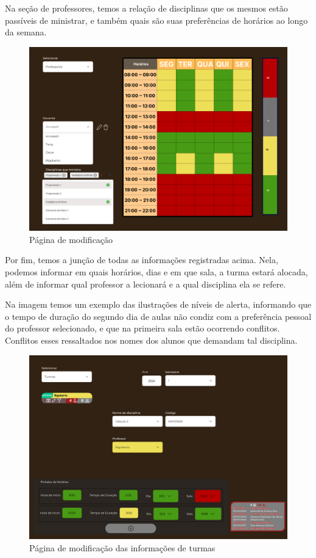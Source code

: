     Na seção de professores, temos a relação de disciplinas que os mesmos estão passíveis de ministrar, e também quais são suas preferências de horários ao longo da semana.

    \begin{figure}[htbp]\centering
        \caption{\label{fig:CRUD_professores} Página de modificação}
        \includegraphics[scale=0.8]{files/img/Prototipo/CRUD_professores.png}
    \end{figure} %

    Por fim, temos a junção de todas as informações registradas acima. Nela, podemos informar em quais horários, dias e em que sala, a turma estará alocada, além de informar qual professor a lecionará e a qual disciplina ela se refere.

    Na imagem temos um exemplo das ilustrações de níveis de alerta, informando que o tempo de duração do segundo dia de aulas não condiz com a preferência pessoal do professor selecionado, e que na primeira sala estão ocorrendo conflitos. Conflitos esses ressaltados nos nomes dos alunos que demandam tal disciplina.

    \begin{figure}[htbp]\centering
        \caption{\label{fig:CRUD_turmas} Página de modificação das informações de turmas}
        \includegraphics[scale=0.8]{files/img/Prototipo/CRUD_turmas.png}
    \end{figure} %

